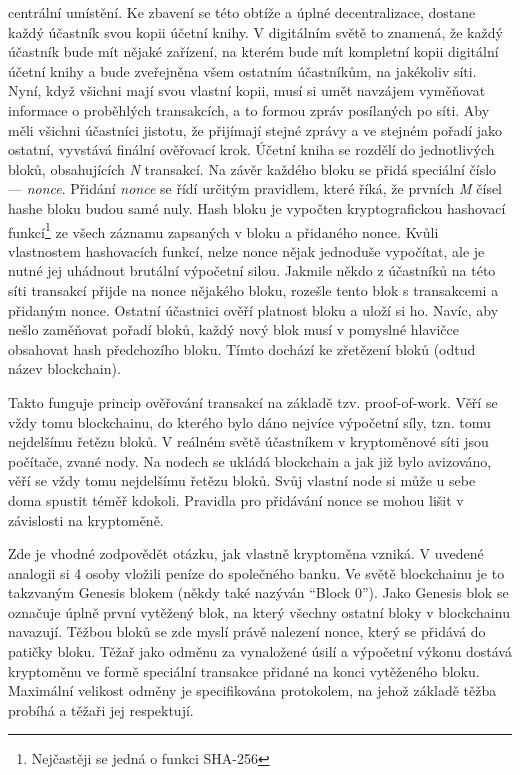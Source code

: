 centrální umístění. Ke zbavení se této obtíže a úplné decentralizace, dostane každý účastník svou kopii účetní knihy. V digitálním světě
to znamená, že
každý účastník bude mít nějaké zařízení, na kterém bude mít kompletní kopii digitální účetní knihy a bude zveřejněna všem ostatním účastníkům,
na jakékoliv síti. Nyní, když všichni mají svou vlastní kopii, musí si umět navzájem vyměňovat informace o proběhlých transakcích, a to formou
zpráv posílaných po síti. Aby měli všichni účastníci jistotu, že přijímají stejné zprávy a ve stejném pořadí jako ostatní, vyvstává finální
ověřovací krok. Účetní kniha se rozdělí do jednotlivých bloků, obsahujících \emph{N} transakcí. Na závěr každého bloku se přidá speciální
číslo --- \emph{nonce}. Přidání \emph{nonce} se řídí určitým pravidlem, které říká, že prvních \emph{M} čísel hashe bloku budou samé nuly.
Hash bloku je vypočten kryptografickou hashovací funkcí\footnote{Nejčastěji se jedná o funkci SHA-256} ze všech záznamu zapsaných v bloku
a přidaného nonce. Kvůli vlastnostem hashovacích funkcí, nelze nonce nějak jednoduše vypočítat, ale je nutné jej uhádnout brutální výpočetní silou.
Jakmile někdo z účastníků na této síti transakcí přijde na nonce nějakého bloku, rozešle tento blok s transakcemi a přidaným nonce.
Ostatní účastnici ověří platnost bloku a uloží si ho. Navíc, aby nešlo  zaměňovat pořadí bloků, každý nový blok musí v pomyslné hlavičce
obsahovat hash předchozího bloku. Tímto dochází ke zřetězení bloků (odtud název blockchain).

Takto funguje princip ověřování transakcí na základě tzv. proof-of-work. Věří se vždy tomu blockchainu, do kterého bylo dáno nejvíce
výpočetní síly, tzn. tomu nejdelšímu řetězu bloků. V reálném světě účastníkem v kryptoměnové síti jsou počítače, zvané nody.
Na nodech se ukládá blockchain a jak již bylo avizováno, věří se vždy tomu nejdelšímu řetězu bloků. Svůj vlastní node si může u sebe doma spustit
téměř kdokoli. Pravidla pro přidávání nonce se mohou lišit v závislosti na kryptoměně.

Zde je vhodné zodpovědět otázku, jak vlastně kryptoměna vzniká. V uvedené analogii si 4 osoby vložili peníze do společného banku.
Ve světě blockchainu je to takzvaným Genesis blokem (někdy také nazýván \enquote{Block 0}). Jako Genesis blok se označuje úplně první
vytěžený blok, na který všechny ostatní bloky v blockchainu navazují. Těžbou bloků se zde myslí právě nalezení nonce, který se přidává do patičky
bloku. Těžař jako odměnu za vynaložené úsilí a výpočetní výkonu dostává kryptoměnu ve formě speciální transakce přidané na konci vytěženého bloku.
Maximální velikost odměny je specifikována protokolem, na jehož základě těžba probíhá a těžaři jej respektují.

